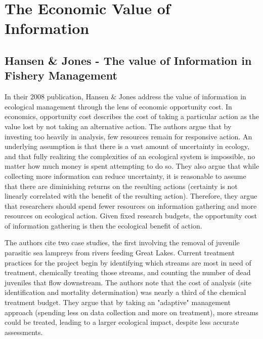 \section{The Economic Value of Information}
\subsection{Hansen \& Jones - The value of Information in Fishery Management}
In their 2008 publication, Hansen \& Jones address the value of information in ecological management through the lens of economic opportunity cost.  In economics, opportunity cost describes the cost of taking a particular action as the value lost by not taking an alternative action.  The authors argue that by investing too heavily in analysis, few resources remain for responsive action.  An underlying assumption is that there is a vast amount of uncertainty in ecology, and that fully realizing the complexities of an ecological system is impossible, no matter how much money is spent attempting to do so.  They also argue that while collecting more information can reduce uncertainty, it is reasonable to assume that there are diminishing returns on the resulting actions (certainty is not linearly correlated with the benefit of the resulting action).  Therefore, they argue that researchers should spend fewer resources on information gathering and more resources on ecological action.  Given fixed research budgets, the opportunity cost of information gathering is then the ecological benefit of action.  

The authors cite two case studies, the first involving the removal of juvenile parasitic sea lampreys from rivers feeding Great Lakes.  Current treatment practices for the project begin by identifying which streams are most in need of treatment, chemically treating those streams, and counting the number of dead juveniles that flow downstream.  The authors note that the cost of analysis (site identification and mortality determination) was nearly a third of the chemical treatment budget.  They argue that by taking an "adaptive" management approach (spending less on data collection and more on treatment), more streams could be treated, leading to a larger ecological impact, despite less accurate assessments.

